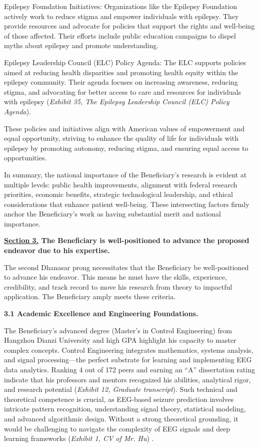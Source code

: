 \documentclass{article}
\begin{document}
Epilepsy Foundation Initiatives: Organizations like the Epilepsy Foundation actively work to reduce stigma and empower individuals with epilepsy. They provide resources and advocate for policies that support the rights and well-being of those affected. Their efforts include public education campaigns to dispel myths about epilepsy and promote understanding.

Epilepsy Leadership Council (ELC) Policy Agenda: The ELC supports policies aimed at reducing health disparities and promoting health equity within the epilepsy community. Their agenda focuses on increasing awareness, reducing stigma, and advocating for better access to care and resources for individuals with epilepsy ({\it Exhibit 35, The Epilepsy Leadership Council (ELC) Policy Agenda}).

These policies and initiatives align with American values of empowerment and equal opportunity, striving to enhance the quality of life for individuals with epilepsy by promoting autonomy, reducing stigma, and ensuring equal access to opportunities.

In summary, the national importance of the Beneficiary’s research is evident at multiple levels: public health improvements, alignment with federal research priorities, economic benefits, strategic technological leadership, and ethical considerations that enhance patient well-being. These intersecting factors firmly anchor the Beneficiary’s work as having substantial merit and national importance.


\clearpage

{\bf \underline{Section 3.} The Beneficiary is well-positioned to advance the proposed endeavor due to his expertise. }

The second Dhanasar prong necessitates that the Beneficiary be well-positioned to advance his endeavor. This means he must have the skills, experience, credibility, and track record to move his research from theory to impactful application. The Beneficiary amply meets these criteria.


{\bf 3.1 Academic Excellence and Engineering Foundations.}

The Beneficiary’s advanced degree (Master’s in Control Engineering) from Hangzhou Dianzi University and high GPA highlight his capacity to master complex concepts. Control Engineering integrates mathematics, systems analysis, and signal processing—the perfect substrate for learning and implementing EEG data analytics. Ranking 4 out of 172 peers and earning an “A” dissertation rating indicate that his professors and mentors recognized his abilities, analytical rigor, and research potential ({\it Exhibit 12, Graduate transcript}).
Such technical and theoretical competence is crucial, as EEG-based seizure prediction involves intricate pattern recognition, understanding signal theory, statistical modeling, and advanced algorithmic design. Without a strong theoretical grounding, it would be challenging to navigate the complexity of EEG signals and deep learning frameworks ({\it Exhibit 1, CV of Mr. Hu}) .
\end{document}

